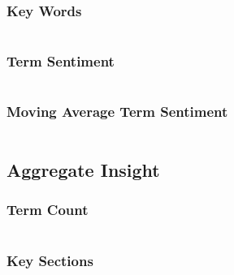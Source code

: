 \documentclass[11pt, a4paper, oneside]{report}
\begin{document}
\subsubsection{Key Words}\label{sec:key-words}

\inputminted[frame=lines,fontsize=\scriptsize,xleftmargin=\parindent,linenos]{R}{R/keywords.R}

\subsubsection{Term Sentiment}\label{sec:term-sentiment}

\inputminted[frame=lines,fontsize=\scriptsize,xleftmargin=\parindent,linenos]{R}{R/term-sentiment.R}

\subsubsection{Moving Average Term Sentiment}\label{sec:moving-average-term}

\inputminted[frame=lines,fontsize=\scriptsize,xleftmargin=\parindent,linenos]{R}{R/ma-term-sentiment.R}

\subsection{Aggregate Insight}\label{sec:aggregate-insight}

\subsubsection{Term Count}\label{sec:term-count}

\inputminted[frame=lines,fontsize=\scriptsize,xleftmargin=\parindent,linenos]{R}{R/term-count.R}

\subsubsection{Key Sections}\label{sec:key-section}

\inputminted[frame=lines,fontsize=\scriptsize,xleftmargin=\parindent,linenos]{R}{R/key-aggregates.R}
\end{document}
